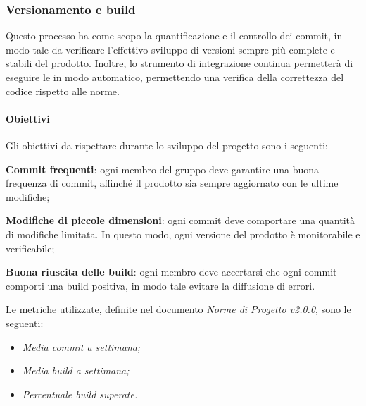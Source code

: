 \subsubsection{Versionamento e build} 
Questo processo ha come scopo la quantificazione e il controllo dei commit, in modo tale da verificare l'effettivo sviluppo di versioni sempre più complete e stabili del prodotto. Inoltre, lo strumento di integrazione continua  permetterà di eseguire le  in modo automatico, permettendo una verifica della correttezza del codice rispetto alle norme.
\paragraph{Obiettivi} \Spazio
Gli obiettivi da rispettare durante lo sviluppo del progetto sono i seguenti:
\begin{itemize}
	\item{\textbf{Commit frequenti}: ogni membro del gruppo deve garantire una buona frequenza di commit, affinché il prodotto sia sempre aggiornato con le ultime modifiche;
	\item{\textbf{Modifiche di piccole dimensioni}: ogni commit deve comportare una quantità di modifiche limitata. In questo modo, ogni versione del prodotto è monitorabile e verificabile;}
	\item{\textbf{Buona riuscita delle build}: ogni membro deve accertarsi che ogni commit comporti una build positiva, in modo tale evitare la diffusione di errori.}
	}
\end{itemize}
Le metriche utilizzate, definite nel documento \emph{Norme di Progetto v2.0.0}, sono le seguenti:
\begin{itemize}
	\item\emph{Media commit a settimana;}
	\item\emph{Media build a settimana;}
	\item\emph{Percentuale build superate.}
\end{itemize}

